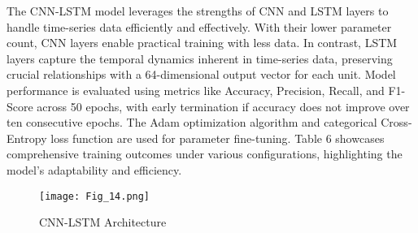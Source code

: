 \documentclass[11pt]{article}
\begin{document}
	The CNN-LSTM model leverages the strengths of CNN and LSTM layers to handle time-series data efficiently and effectively. With their lower parameter count,
	CNN layers enable practical training with less data. In contrast, LSTM layers capture the temporal dynamics inherent in time-series data, preserving crucial relationships with a 64-dimensional output vector for each unit. Model performance is
	evaluated using metrics like Accuracy, Precision, Recall, and F1-Score across 50
	epochs, with early termination if accuracy does not improve over ten consecutive
	epochs. The Adam optimization algorithm and categorical Cross-Entropy loss function are used for parameter fine-tuning. Table 6 showcases comprehensive training
	outcomes under various configurations, highlighting the model’s adaptability and
	efficiency.
	
	\begin{figure}[t]
		\centering
		\texttt{[image: Fig\_14.png]}
		\caption{CNN-LSTM Architecture}
	\end{figure}
	
	\begin{table}[h]
		\centering
		\caption{Training Results of the CNN-LSTM Model}
	\end{table}
	
\end{document}
